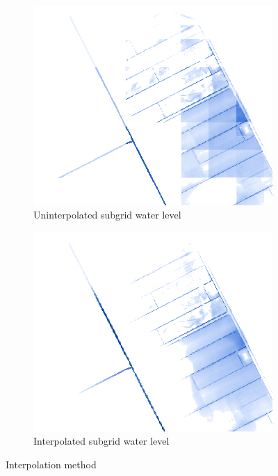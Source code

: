 \documentclass[a4paper]{article}
\begin{document}
\begin{figure}[htpb]
  \centering
  \begin{subfigure}{0.4\textwidth}
    \includegraphics[width=1\textwidth]{arta}
    \caption{Uninterpolated subgrid water level}
    \label{fig:arta}
  \end{subfigure}
  \begin{subfigure}{0.4\textwidth}
    \includegraphics[width=1\textwidth]{artb}
    \caption{Interpolated subgrid water level}
    \label{fig:artb}
  \end{subfigure}
  \label{fig:artifacts}
  \caption{Interpolation method}
\end{figure}
\end{document}

